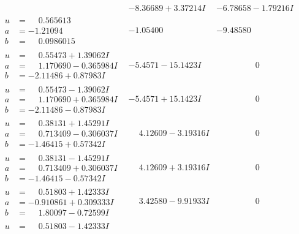 \documentclass[1p]{elsarticle_modified}
\theoremstyle{definition}
\begin{document}
$$\begin{array}{c|c|c}
 & -8.36689 + 3.37214 I & -6.78658 - 1.79216 I \\ \hline\begin{aligned}
u &= \phantom{-}0.565613\phantom{ +0.000000I} \\
a &= -1.21094\phantom{ +0.000000I} \\
b &= \phantom{-}0.0986015\phantom{ +0.000000I}\end{aligned}
 & -1.05400\phantom{ +0.000000I} & -9.48580\phantom{ +0.000000I} \\ \hline\begin{aligned}
u &= \phantom{-}0.55473 + 1.39062 I \\
a &= \phantom{-}1.170690 - 0.365984 I \\
b &= -2.11486 + 0.87983 I\end{aligned}
 & -5.4571 - 15.1423 I & \phantom{-0.000000 } 0 \\ \hline\begin{aligned}
u &= \phantom{-}0.55473 - 1.39062 I \\
a &= \phantom{-}1.170690 + 0.365984 I \\
b &= -2.11486 - 0.87983 I\end{aligned}
 & -5.4571 + 15.1423 I & \phantom{-0.000000 } 0 \\ \hline\begin{aligned}
u &= \phantom{-}0.38131 + 1.45291 I \\
a &= \phantom{-}0.713409 - 0.306037 I \\
b &= -1.46415 + 0.57342 I\end{aligned}
 & \phantom{-}4.12609 - 3.19316 I & \phantom{-0.000000 } 0 \\ \hline\begin{aligned}
u &= \phantom{-}0.38131 - 1.45291 I \\
a &= \phantom{-}0.713409 + 0.306037 I \\
b &= -1.46415 - 0.57342 I\end{aligned}
 & \phantom{-}4.12609 + 3.19316 I & \phantom{-0.000000 } 0 \\ \hline\begin{aligned}
u &= \phantom{-}0.51803 + 1.42333 I \\
a &= -0.910861 + 0.309333 I \\
b &= \phantom{-}1.80097 - 0.72599 I\end{aligned}
 & \phantom{-}3.42580 - 9.91933 I & \phantom{-0.000000 } 0 \\ \hline\begin{aligned}
u &= \phantom{-}0.51803 - 1.42333 I \\

\end{aligned}
\end{array}$$
\end{document}
